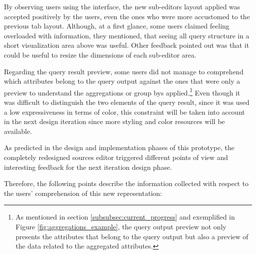 By observing users using the interface, the new sub-editors layout applied was accepted positively by the users, even the ones who were more accustomed to the previous tab layout. Although, at a first glance, some users claimed feeling overloaded with information, they mentioned, that seeing all query structure in a short visualization area above was useful. Other feedback pointed out was that it could be useful to resize the dimensions of each sub-editor area.

Regarding the query result preview, some users did not manage to comprehend which attributes belong to the query output against the ones that were only a preview to understand the aggregations or group bys applied.\footnote{As mentioned in section \ref{subsubsec:current_progress} and exemplified in Figure \ref{fig:aggregations_example}, the query output preview not only presents the attributes that belong to the query output but also a preview of the data related to the aggregated attributes.} 
Even though it was difficult to distinguish the two elements of the query result, since it was used a low expressiveness in terms of color, this constraint will be taken into account in the next design iteration since more styling and color resources will be available.

As predicted in the design and implementation phases of this prototype, the completely redesigned sources editor triggered different points of view and interesting feedback for the next iteration design phase.

Therefore, the following points describe the information collected with respect to the users' comprehension of this new representation:

